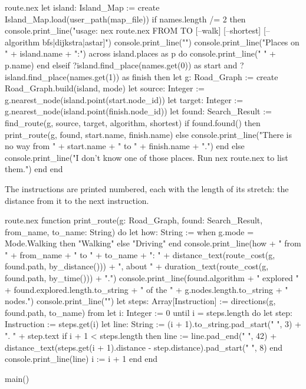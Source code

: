\begin{continued}{route.nex}
  let island: Island_Map := create Island_Map.load(user_path(map_file))
  if names.length /= 2 then
    console.print_line("usage: nex route.nex FROM TO [--walk] [--shortest] [--algorithm bfs|dijkstra|astar]")
    console.print_line("")
    console.print_line("Places on " + island.name + ":")
    across island.places as p do
      console.print_line("  " + p.name)
    end
  elseif ?island.find_place(names.get(0)) as start
      and ?island.find_place(names.get(1)) as finish then
    let g: Road_Graph := create Road_Graph.build(island, mode)
    let source: Integer := g.nearest_node(island.point(start.node_id))
    let target: Integer := g.nearest_node(island.point(finish.node_id))
    let found: Search_Result := find_route(g, source, target, algorithm, shortest)
    if found.found() then
      print_route(g, found, start.name, finish.name)
    else
      console.print_line("There is no way from " + start.name + " to " + finish.name + ".")
    end
  else
    console.print_line("I don't know one of those places. Run nex route.nex to list them.")
  end
end
\end{continued}

The instructions are printed numbered, each with the length of its stretch:
the distance from it to the next instruction.

\begin{continued}{route.nex}
function print_route(g: Road_Graph, found: Search_Result, from_name, to_name: String) do
  let how: String := when g.mode = Mode.Walking then "Walking" else "Driving" end
  console.print_line(how + " from " + from_name + " to " + to_name + ": "
    + distance_text(route_cost(g, found.path, by_distance())) + ", about "
    + duration_text(route_cost(g, found.path, by_time())) + ".")
  console.print_line(found.algorithm + " explored " + found.explored.length.to_string
    + " of the " + g.nodes.length.to_string + " nodes.")
  console.print_line("")
  let steps: Array[Instruction] := directions(g, found.path, to_name)
  from
    let i: Integer := 0
  until
    i = steps.length
  do
    let step: Instruction := steps.get(i)
    let line: String := (i + 1).to_string.pad_start(" ", 3) + ". " + step.text
    if i + 1 < steps.length then
      line := line.pad_end(" ", 42)
        + distance_text(steps.get(i + 1).distance - step.distance).pad_start(" ", 8)
    end
    console.print_line(line)
    i := i + 1
  end
end

main()
\end{continued}

